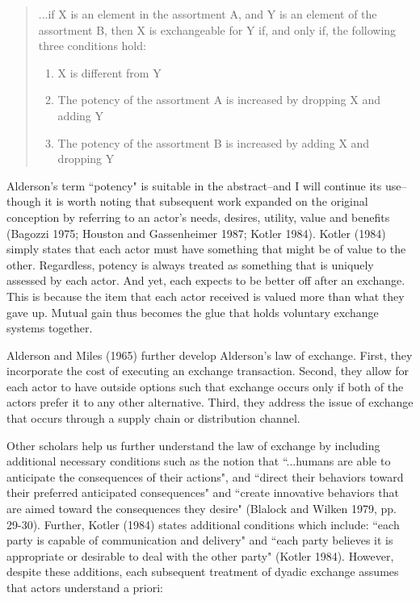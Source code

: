 \begin{footnotesize}
\begin{quote}
...if X is an element in the assortment A, and Y is an element of the assortment B, then X is exchangeable for Y if, and only if, the following three conditions hold:
\begin{enumerate}
  \item X is different from Y
  \item The potency of the assortment A is increased by dropping X and adding Y
  \item The potency of the assortment B is increased by adding X and dropping Y
\end{enumerate}
\end{quote}
\end{footnotesize}

Alderson's term ``potency" is suitable in the abstract--and I will continue its use--though it is worth noting that subsequent work expanded on the original conception by referring to an actor's needs, desires, utility, value and benefits (Bagozzi 1975; Houston and Gassenheimer 1987; Kotler 1984). Kotler (1984) simply states that each actor must have something that might be of value to the other. Regardless, potency is always treated as something that is uniquely assessed by each actor. And yet, each expects to be better off after an exchange. This is because the item that each actor received is valued more than what they gave up. Mutual gain thus becomes the glue that holds voluntary exchange systems together. 

Alderson and Miles (1965) further develop Alderson's law of exchange. First, they incorporate the cost of executing an exchange transaction. Second, they allow for each actor to have outside options such that exchange occurs only if both of the actors prefer it to any other alternative. Third, they address the issue of exchange that occurs through a supply chain or distribution channel. 

Other scholars help us further understand the law of exchange by including additional necessary conditions such as the notion that ``...humans are able to anticipate the consequences of their actions", and ``direct their behaviors toward their preferred anticipated consequences" and ``create innovative behaviors that are aimed toward the consequences they desire" (Blalock and Wilken 1979, pp. 29-30).  Further, Kotler (1984) states additional conditions which include: ``each party is capable of communication and delivery" and ``each party believes it is appropriate or desirable to deal with the other party" (Kotler 1984). However, despite these additions, each subsequent treatment of dyadic exchange assumes that actors understand a priori: 


